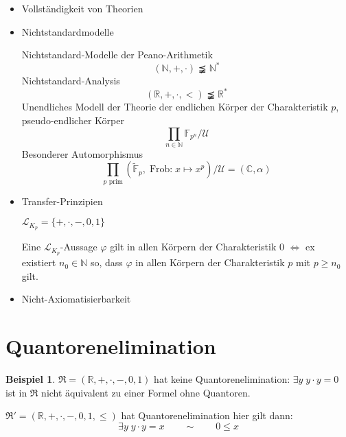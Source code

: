 \documentclass[12pt,parskip=full]{scrartcl}
\newcommand{\setN}{\mathbb{N}}
\newcommand{\setR}{\mathbb{R}}
\newcommand{\setC}{\mathbb{C}}
\theoremstyle{definition}
\newtheorem{example}[theorem]{Beispiel}
\begin{document}
	\begin{itemize}
		\item Vollständigkeit von Theorien
		\item Nichtstandardmodelle
		
		Nichtstandard-Modelle der Peano-Arithmetik
		\begin{equation*}
			(\setN, +, \cdot) \precneqq \setN^*
		\end{equation*}
		Nichtstandard-Analysis
		\begin{equation*}
			(\setR, +, \cdot, <) \precneqq \setR^*
		\end{equation*}
		Unendliches Modell der Theorie der endlichen Körper der Charakteristik $p$, pseudo-endlicher Körper
		\begin{equation*}
			\prod_{n \in \setN} \mathbb{F}_{p^n} / \mathcal{U}
		\end{equation*}
		Besonderer Automorphismus
		\begin{equation*}
			\prod_{p \text{ prim}} (\tilde{\mathbb{F}}_p, \operatorname{Frob:} x \mapsto x^p) / \mathcal{U} = (\setC, \alpha)
		\end{equation*}
		
		\item Transfer-Prinzipien
		
		$\mathcal{L}_{K_p} = \{ +, \cdot, -, 0, 1 \}$
		
		Eine $\mathcal{L}_{K_p}$-Aussage $\varphi$ gilt in allen Körpern der Charakteristik $0$ $\Leftrightarrow$ ex existiert $n_0 \in \setN$ so, dass $\varphi$ in allen Körpern der Charakteristik $p$ mit $p \geq n_0$ gilt.
		
		\item Nicht-Axiomatisierbarkeit
	\end{itemize}

	\section{Quantorenelimination}
	
	\begin{example}
		$\mathfrak{R} = (\setR, +, \cdot, -, 0, 1)$ hat keine Quantorenelimination: $\exists y \; y \cdot y = 0$ ist in $\mathfrak{R}$ nicht äquivalent zu einer Formel ohne Quantoren.
		
		$\mathfrak{R}' = (\setR, +, \cdot, -, 0, 1, \leq)$ hat Quantorenelimination hier gilt dann:
		\begin{equation*}
			\exists y \; y \cdot y = x \qquad \sim \qquad 0 \leq x
		\end{equation*}
	\end{example}
\end{document}
